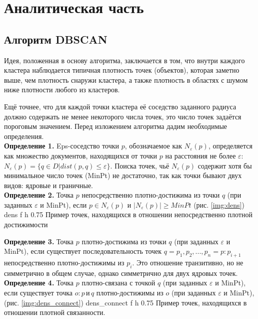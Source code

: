 \chapter{Аналитическая часть}

\section{Алгоритм DBSCAN}
Идея, положенная в основу алгоритма, заключается в том, что внутри каждого кластера наблюдается типичная плотность точек (объектов), которая заметно выше, чем плотность снаружи кластера, а также плотность в областях с шумом ниже плотности любого из кластеров. 

Ещё точнее, что для каждой точки кластера её соседство заданного радиуса должно содержать не менее некоторого числа точек, это число точек задаётся пороговым значением. 
Перед изложением алгоритма дадим необходимые определения.\\

\textbf{Определение 1.} Eps-соседство точки \(p\), обозначаемое как \(N_{\varepsilon}(p)\), определяется как множество документов, находящихся от точки \(p\) на расстояния не более \(\varepsilon\): 
\(N_{\varepsilon}(p) = \{ q \in D | dist(p, q) \le \varepsilon \}\). Поиска точек, чьё \(N_{\varepsilon}(p)\) содержит хотя бы минимальное число точек (MinPt) не достаточно, так как точки бывают двух видов: 
ядровые и граничные.\\
\indent\textbf{Определение 2.} Точка \(p\) непосредственно плотно-достижима из точки \(q\) (при заданных \(\varepsilon\) и MinPt), если \( p \in N_{\varepsilon}(p) \) и \(|N_{\varepsilon}(p)| \ge MinPt \) (рис. \ref{img:dens}) 
{dens} %
{f} %
{h} %
{0.75\textwidth} %
{Пример точек, находящихся в отношении непосредственно плотной достижимости} %

\textbf{Определение 3.} Точка \(p\) плотно-достижима из точки \(q\) (при заданных \(\varepsilon\) и MinPt), если существует последовательность точек \(q = p_1, p_2, ... , p_n = p: p_{i+1}\) непосредственно плотно-достижимы из \(p_i\). 
Это отношение транзитивно, но не симметрично в общем случае, однако симметрично для двух ядровых точек.\\ 
\clearpage
\indent\textbf{Определение 4.} Точка \(p\) плотно-связана с точкой \(q\) (при заданных \(\varepsilon\) и MinPt), если существует точка \(o: p\, \text{и}\, q\) плотно-достижимы из \(o\) (при заданных \(\varepsilon\) и MinPt), (рис. \ref{img:dens_connect})
{dens_connect} %
{f} %
{h} %
{0.75\textwidth} %
{Пример точек, находящихся в отношении плотной связанности.} %

